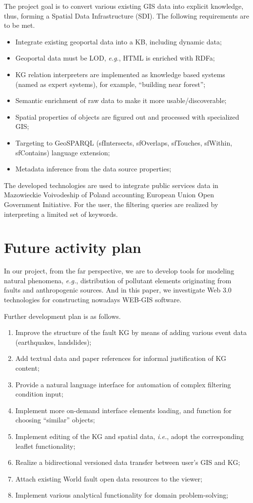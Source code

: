 \documentclass[
]{ceurart}
\begin{document}
   The project \cite{iwaniak1,iwaniak17} goal is to convert various existing GIS data into explicit knowledge, thus, forming a Spatial Data Infrastructure (SDI). The following requirements are to be met.
  \begin{itemize}
  \item Integrate existing geoportal data into a KB, including dynamic data;
  \item Geoportal data must be LOD, \emph{e.g.}, HTML is enriched with RDFa;
  \item KG relation interpreters are implemented as knowledge based systems (named as expert systems), for example, ``building near forest'';
  \item Semantic enrichment of raw data to make it more usable/discoverable;
  \item Spatial properties of objects are figured out and processed with specialized GIS;
  \item Targeting to GeoSPARQL (sfIntersects, sfOverlaps, sfTouches, sfWithin, sfContains) language extension;
  \item Metadata inference from the data source properties;
  \end{itemize}
  The developed technologies are used to integrate public services data in Mazowieckie Voivodeship of Poland accounting European Union Open Government Initiative.  For the user, the filtering queries are realized by interpreting a limited set of keywords.

\section{Future activity plan}

In our project, from the far perspective, we are to develop tools for modeling natural phenomena, \emph{e.g.}, distribution of pollutant elements originating from faults and anthropogenic sources.  And in this paper, we investigate Web 3.0 technologies for constructing nowadays WEB-GIS software.

Further development plan is as follows.
\begin{enumerate}
\item Improve the structure of the fault KG by means of adding various event data (earthquakes, landslides);
\item Add textual data and paper references for informal justification of KG content;
\item Provide a natural language interface for automation of complex filtering condition input;
\item Implement more on-demand interface elements loading, and function for choosing ``similar'' objects;
\item Implement editing of the KG and spatial data, \emph{i.e.}, adopt the corresponding leaflet functionality;
\item Realize a bidirectional versioned data transfer between user's GIS and KG;
\item Attach existing World fault open data resources to the viewer;
\item Implement various analytical functionality for domain problem-solving;
\end{enumerate}
\end{document}
